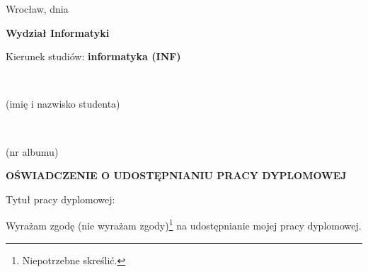 

\makeatletter
{}

\begin{flushright}
    Wrocław, dnia \@when
  \end{flushright}

  \begin{flushleft}
    {\fontsize{14}{14} \selectfont
    
    \vspace*{20pt}
    {\bf Wydział Informatyki}
    
    \bigskip
    Kierunek studiów: {\bf informatyka (INF)}
    }  
  \vspace*{30pt}
  
  {~\@author} %
  \vspace*{-4pt}
  
  \makebox[220pt][r]{\dotfill} %

  \vspace*{-2pt}
  {\scriptsize (imię i nazwisko studenta)}

  \bigskip
  {~\@album} %
  
  \vspace*{-4pt}
  \makebox[220pt][r]{\dotfill} %
  
  \vspace*{-2pt}
  {\scriptsize (nr albumu)}
\end{flushleft}

  \bigskip

\begin{center}
  {\fontsize{16}{16} \selectfont \bf OŚWIADCZENIE O UDOSTĘPNIANIU PRACY DYPLOMOWEJ}
\end{center}

\bigskip

\begin{flushright} %
    \vspace*{-4pt}
    \parbox{350pt}{
        Tytuł pracy dyplomowej: ~\@title
      }
\end{flushright}

\bigskip

\begin{flushright}
  Wyrażam zgodę (nie wyrażam zgody)\footnote{Niepotrzebne skreślić.} na udostępnianie mojej pracy dyplomowej.
\end{flushright}

\bigskip

\vspace*{30pt}
\begin{flushright} %
    \makebox[150pt]{\dotfill} %
  
  \vspace*{-2pt}
\end{flushright}

\restoregeometry
\makeatother